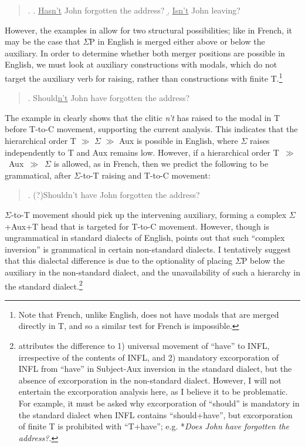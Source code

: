 \singlespacing
\begin{quote}
\ex.
\a. \underline{Hasn't} John forgotten the address?
\b. \underline{Isn't} John leaving?

\end{quote}
\onehalfspacing
However, the examples in \Last allow for two structural possibilities; like in French, it may be the case that $\Sigma$P in English is merged either above or below the auxiliary. In order to determine whether both merger positions are possible in English, we must look at auxiliary constructions with modals, which do not target the auxiliary verb for raising, rather than constructions with finite T.\footnote{Note that French, unlike English, does not have modals that are merged directly in T, and so a similar test for French is impossible.}

\singlespacing
\begin{quote}
\ex. Should\underline{n't} John have forgotten the address?

\end{quote}
\onehalfspacing
The example in \Last clearly shows that the clitic {\it n't} has raised to the modal in T before T-to-C movement, supporting the current analysis. This indicates that the hierarchical order T $\gg$ $\Sigma$ $\gg$ Aux is possible in English, where $\Sigma$ raises independently to T and Aux remains low. However, if a hierarchical order T~$\gg$~Aux~$\gg$~$\Sigma$ is allowed, as in French, then we predict the following to be grammatical, after $\Sigma$-to-T raising and T-to-C movement:

\singlespacing
\begin{quote}
\ex. (?)Shouldn't have John forgotten the address?

\end{quote}
\onehalfspacing
$\Sigma$-to-T movement should pick up the intervening auxiliary, forming a complex $\Sigma$+Aux+T head that is targeted for T-to-C movement. However, though \Last is ungrammatical in standard dialects of English, \citet{johnson1988} points out that such ``complex inversion'' is grammatical in certain non-standard dialects. I tentatively suggest that this dialectal difference is due to the optionality of placing $\Sigma$P below the auxiliary in the non-standard dialect, and the unavailability of such a hierarchy in the standard dialect.\footnote{\citet{johnson1988} attributes the difference to 1) universal movement of ``have'' to INFL, irrespective of the contents of INFL, and 2) mandatory excorporation of INFL from ``have'' in Subject-Aux inversion in the standard dialect, but the absence of excorporation in the non-standard dialect. However, I will not entertain the excorporation analysis here, as I believe it to be problematic. For example, it must be asked why excorporation of ``should'' is mandatory in the standard dialect when INFL contains ``should+have'', but excorporation of finite T is prohibited with ``T+have''; e.g. *{\it Does John have forgotten the address?}.}

